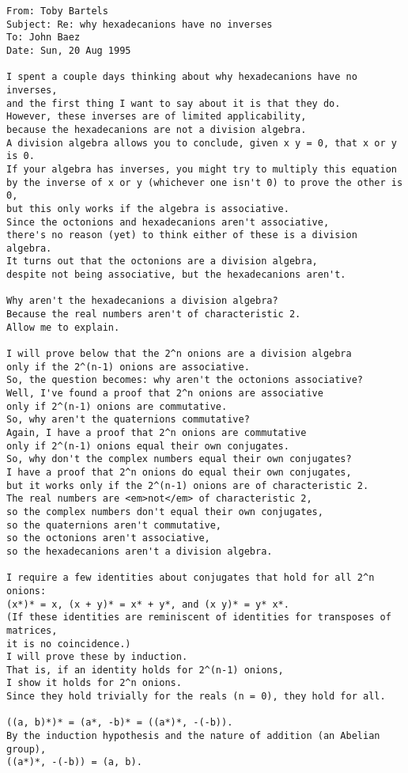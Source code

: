 \begin{verbatim}
From: Toby Bartels
Subject: Re: why hexadecanions have no inverses
To: John Baez
Date: Sun, 20 Aug 1995 

I spent a couple days thinking about why hexadecanions have no inverses,
and the first thing I want to say about it is that they do.
However, these inverses are of limited applicability,
because the hexadecanions are not a division algebra.
A division algebra allows you to conclude, given x y = 0, that x or y is 0.
If your algebra has inverses, you might try to multiply this equation
by the inverse of x or y (whichever one isn't 0) to prove the other is 0,
but this only works if the algebra is associative.
Since the octonions and hexadecanions aren't associative,
there's no reason (yet) to think either of these is a division algebra.
It turns out that the octonions are a division algebra,
despite not being associative, but the hexadecanions aren't.

Why aren't the hexadecanions a division algebra?
Because the real numbers aren't of characteristic 2.
Allow me to explain.

I will prove below that the 2^n onions are a division algebra
only if the 2^(n-1) onions are associative.
So, the question becomes: why aren't the octonions associative?
Well, I've found a proof that 2^n onions are associative
only if 2^(n-1) onions are commutative.
So, why aren't the quaternions commutative?
Again, I have a proof that 2^n onions are commutative
only if 2^(n-1) onions equal their own conjugates.
So, why don't the complex numbers equal their own conjugates?
I have a proof that 2^n onions do equal their own conjugates,
but it works only if the 2^(n-1) onions are of characteristic 2.
The real numbers are <em>not</em> of characteristic 2,
so the complex numbers don't equal their own conjugates,
so the quaternions aren't commutative,
so the octonions aren't associative,
so the hexadecanions aren't a division algebra.

I require a few identities about conjugates that hold for all 2^n onions:
(x*)* = x, (x + y)* = x* + y*, and (x y)* = y* x*.
(If these identities are reminiscent of identities for transposes of matrices,
it is no coincidence.)
I will prove these by induction.
That is, if an identity holds for 2^(n-1) onions,
I show it holds for 2^n onions.
Since they hold trivially for the reals (n = 0), they hold for all.

((a, b)*)* = (a*, -b)* = ((a*)*, -(-b)).
By the induction hypothesis and the nature of addition (an Abelian group),
((a*)*, -(-b)) = (a, b).


\end{verbatim}
